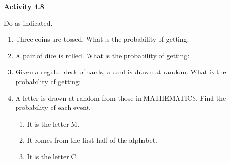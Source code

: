   \vspace*{0.3ex}

\noindent\textbf{Activity 4.8}

\vspace*{0.2ex}

Do as indicated. 
\begin{enumerate} 
\item Three coins are tossed. What is the probability of getting:
\begin{enumerate} 
\end{enumerate} 

\item A pair of dice is rolled. What is the probability of getting: 
\begin{enumerate} 
\end{enumerate} 
\item Given a regular deck of cards, a card is drawn at random. What is the probability of getting:
\begin{enumerate}
\end{enumerate} 
\item A letter is drawn at random from those in MATHEMATICS. Find the probability of each event.
\begin{enumerate}
\item It is the letter M. 
\item It comes from the first half of the alphabet. 
\item It is the letter C.
\end{enumerate} 
 
\end{enumerate}   

 
